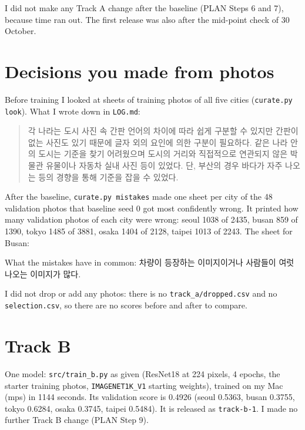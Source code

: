 \documentclass[11pt]{article}
\begin{document}
I did not make any Track A change after the baseline (PLAN Steps 6 and 7),
because time ran out. The first release was also after the mid-point check of
30 October.

\section*{Decisions you made from photos}

Before training I looked at sheets of training photos of all five cities
(\texttt{curate.py look}). What I wrote down in \texttt{LOG.md}:

\begin{quote}
각 나라는 도시 사진 속 간판 언어의 차이에 따라 쉽게 구분할 수 있지만 간판이 없는
사진도 있기 때문에 글자 외의 요인에 의한 구분이 필요하다. 같은 나라 안의 도시는
기준을 찾기 어려웠으며 도시의 거리와 직접적으로 연관되지 않은 박물관 유물이나
자동차 실내 사진 등이 있었다. 단, 부산의 경우 바다가 자주 나오는 등의 경향을 통해
기준을 잡을 수 있었다.
\end{quote}

After the baseline, \texttt{curate.py mistakes} made one sheet per city of the
48 validation photos that baseline seed 0 got most confidently wrong. It
printed how many validation photos of each city were wrong: seoul 1038 of
2435, busan 859 of 1390, tokyo 1485 of 3881, osaka 1404 of 2128, taipei 1013
of 2243. The sheet for Busan:


What the mistakes have in common: 차량이 등장하는 이미지이거나 사람들이 여럿 나오는 이미지가 많다.

I did not drop or add any photos: there is no \texttt{track\_a/dropped.csv}
and no \texttt{selection.csv}, so there are no scores before and after to
compare.

\section*{Track B}

One model: \texttt{src/train\_b.py} as given (ResNet18 at 224 pixels, 4
epochs, the starter training photos, \texttt{IMAGENET1K\_V1} starting
weights), trained on my Mac (mps) in 1144 seconds. Its validation score is
0.4926 (seoul 0.5363, busan 0.3755, tokyo 0.6284, osaka 0.3745, taipei
0.5484). It is released as \texttt{track-b-1}. I made no further Track B
change (PLAN Step 9).
\end{document}
